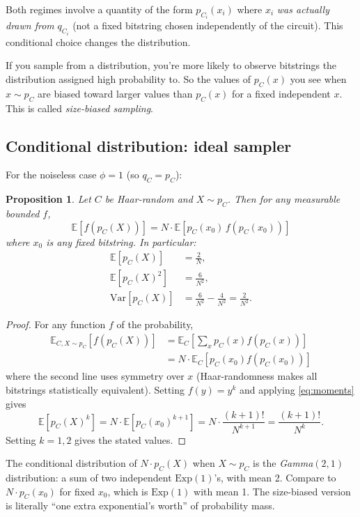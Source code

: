 \documentclass[11pt]{article}
\newtheorem{proposition}[theorem]{Proposition}
\theoremstyle{definition}
\theoremstyle{remark}
\newcommand{\E}{\mathbb{E}}
\begin{document}
Both regimes involve a quantity of the form $p_{C_i}(x_i)$ where $x_i$
\emph{was actually drawn from} $q_{C_i}$ (not a fixed bitstring chosen
independently of the circuit). This conditional choice changes the
distribution.

\begin{intuition}
If you sample from a distribution, you're more likely to observe bitstrings
the distribution assigned high probability to. So the values of $p_C(x)$
you see when $x \sim p_C$ are biased toward larger values than $p_C(x)$
for a fixed independent $x$. This is called \emph{size-biased sampling}.
\end{intuition}

\subsection{Conditional distribution: ideal sampler}

For the noiseless case $\phi = 1$ (so $q_C = p_C$):

\begin{proposition}
\label{prop:sizebias}
Let $C$ be Haar-random and $X \sim p_C$. Then for any measurable bounded
$f$,
\[
  \E[f(p_C(X))] = N \cdot \E[p_C(x_0)\, f(p_C(x_0))]
\]
where $x_0$ is any fixed bitstring. In particular:
\begin{align*}
  \E[p_C(X)] &= \frac{2}{N}, \\
  \E[p_C(X)^2] &= \frac{6}{N^2}, \\
  \mathrm{Var}[p_C(X)] &= \frac{6}{N^2} - \frac{4}{N^2} = \frac{2}{N^2}.
\end{align*}
\end{proposition}

\begin{proof}
For any function $f$ of the probability,
\begin{align*}
\E_{C, X \sim p_C}[f(p_C(X))]
  &= \E_C\!\left[\sum_x p_C(x) f(p_C(x))\right] \\
  &= N \cdot \E_C[p_C(x_0) f(p_C(x_0))]
\end{align*}
where the second line uses symmetry over $x$ (Haar-randomness makes all
bitstrings statistically equivalent). Setting $f(y) = y^k$ and applying
\eqref{eq:moments} gives
\[
  \E[p_C(X)^k] = N \cdot \E[p_C(x_0)^{k+1}] = N \cdot \frac{(k+1)!}{N^{k+1}}
  = \frac{(k+1)!}{N^k}.
\]
Setting $k=1, 2$ gives the stated values. \qedhere
\end{proof}

\begin{intuition}
The conditional distribution of $N \cdot p_C(X)$ when $X \sim p_C$
is the \emph{Gamma}$(2,1)$ distribution: a sum of two independent
$\mathrm{Exp}(1)$'s, with mean 2. Compare to $N \cdot p_C(x_0)$ for fixed
$x_0$, which is $\mathrm{Exp}(1)$ with mean 1. The size-biased version is
literally ``one extra exponential's worth'' of probability mass.
\end{intuition}
\end{document}
